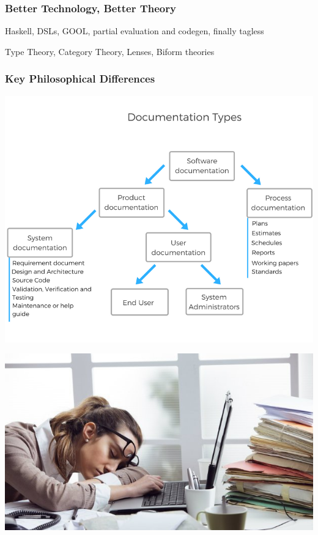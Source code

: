 \documentclass[usenames,dvipsnames,10pt]{beamer}
\begin{document}
  
\begin{frame}
  
  \frametitle{Better Technology, Better Theory}
Haskell, DSLs, GOOL, partial evaluation and codegen, finally tagless

Type Theory, Category Theory, Lenses, Biform theories

\end{frame}
  
\begin{frame}[fragile]
  
  \frametitle{Key Philosophical Differences}
\begin{minipage}{0.48\textwidth}
\includegraphics[width=1.0\textwidth]{DocKinds.png}
\end{minipage}
\begin{minipage}{0.48\textwidth}
\includegraphics[width=1.0\textwidth]{BoredAtWork.jpg}
\end{minipage}


\end{frame}
\end{document}

